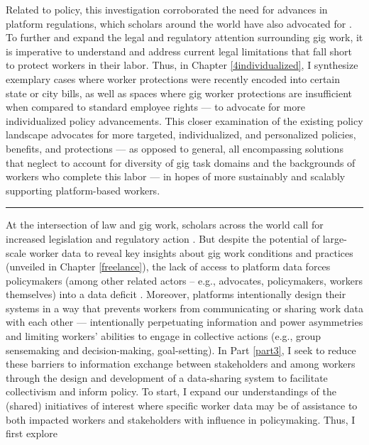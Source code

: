 Related to policy, this investigation corroborated the need for advances in platform regulations, which scholars around the world have also advocated for \cite{regulate, deficit, regulating, Dubal2017-bj, Dubal2019-qi}. 
To further and expand the legal and regulatory attention surrounding gig work, it is imperative to understand and address current legal limitations that fall short to protect workers in their labor. Thus, in Chapter \ref{4individualized}, I synthesize exemplary cases where worker protections were recently encoded into certain state or city bills, as well as spaces where gig worker protections are insufficient when compared to standard employee rights --- to advocate for more individualized policy advancements. This closer examination of the existing policy landscape advocates for more targeted, individualized, and personalized policies, benefits, and protections --- as opposed to general, all encompassing solutions that neglect to account for diversity of gig task domains and the backgrounds of workers who complete this labor --- in hopes of more sustainably and scalably supporting platform-based workers. 

\vspace{1em}
\hrule
\vspace{1em}

At the intersection of law and gig work, scholars across the world call for increased legislation and regulatory action \cite{regulate, organizing}.
But despite the potential of large-scale worker data to reveal key insights about gig work conditions and practices (unveiled in Chapter \ref{freelance}), the lack of access to platform data forces policymakers (among other related actors -- e.g., advocates, policymakers, workers themselves) into a data deficit \cite{deficit}. 
Moreover, platforms intentionally design their systems in a way that prevents workers from communicating or sharing work data with each other \cite{uuapp} --- intentionally perpetuating information and power asymmetries and limiting workers' abilities to engage in collective actions (e.g., group sensemaking and decision-making, goal-setting). 
In Part \ref{part3}, I seek to reduce these barriers to information exchange between stakeholders and among workers through the design and development of a data-sharing system to facilitate collectivism and inform policy. To start, I expand our understandings of the (shared) initiatives of interest where specific worker data may be of assistance to both impacted workers and
stakeholders with influence in policymaking. Thus, I first explore 

